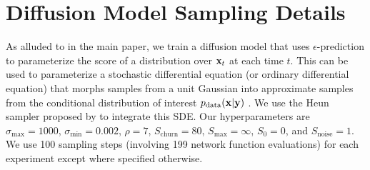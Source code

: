 \chapter{Diffusion Model Sampling Details}
As alluded to in the main paper, we train a diffusion model that uses $\epsilon$-prediction to parameterize the score of a distribution over $\mathbf{x}_t$ at each time $t$. This can be used to parameterize a stochastic differential equation (or ordinary differential equation) that morphs samples from a unit Gaussian into approximate samples from the conditional distribution of interest $p_\text{data}(\mathbf{x}|\mathbf{y})$ \citep{song2020score}. We use the Heun sampler proposed by \citet{karras2022elucidating} to integrate this SDE. Our hyperparameters are $\sigma_\text{max}=1000$, $\sigma_\text{min} = 0.002$, $\rho=7$, $S_\text{churn}=80$, $S_\text{max}=\infty$, $S_0=0$, and $S_\text{noise}=1$. We use 100 sampling steps (involving 199 network function evaluations) for each experiment except where specified otherwise. 




